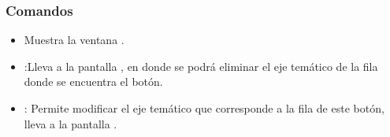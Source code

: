 \newpage
\subsubsection{Comandos}
\begin{itemize}
 \item {} Muestra la ventana .
 \item {}:Lleva a la pantalla , en donde se podrá eliminar el eje temático de la fila donde se encuentra el botón. 
 \item {}: Permite modificar el eje temático que corresponde a la fila de este botón, lleva a la pantalla .

\end{itemize}


